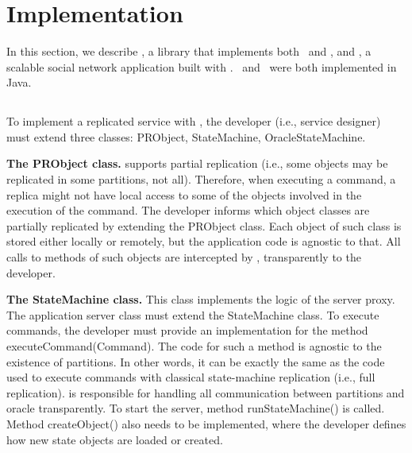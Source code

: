 \section{Implementation}
\label{sec:dssmr-implementation}

In this section, we describe \dssmrlibname{}, a library that implements both \ssmr\
and \dssmr{}, and \dssmrappname{}, a scalable social network application built with
\dssmrlibname{}. \dssmrlibname\ and \dssmrappname\ were both implemented in Java.

\subsection{\dssmrlibname}

To implement a replicated service with \dssmrlibname{}, the developer (i.e., service
designer) must extend three classes: PRObject, StateMachine, OracleStateMachine.

\textbf{The PRObject class.} \dssmrlibname{} supports partial replication (i.e., some
objects may be replicated in some partitions, not all). Therefore, when
executing a command, a replica might not have local access to some of the
objects involved in the execution of the command. The developer informs
\dssmrlibname{} which object classes are partially replicated by extending the
PRObject class. Each object of such class is stored either locally or remotely,
but the application code is agnostic to that. All calls to methods of such
objects are intercepted by \dssmrlibname{}, transparently to the developer.


\textbf{The StateMachine class.} This class implements the logic of the server
proxy. The application server class must extend the StateMachine class. To
execute commands, the developer must provide an implementation for the method
executeCommand(Command). The code for such a method is agnostic to the existence
of partitions. In other words, it can be exactly the same as the code used to
execute commands with classical state-machine replication (i.e., full
replication). \dssmrlibname{} is responsible for handling all communication between
partitions and oracle transparently. To start the server, method
runStateMachine() is called. Method createObject() also needs to be implemented,
where the developer defines how new state objects are loaded or created.

